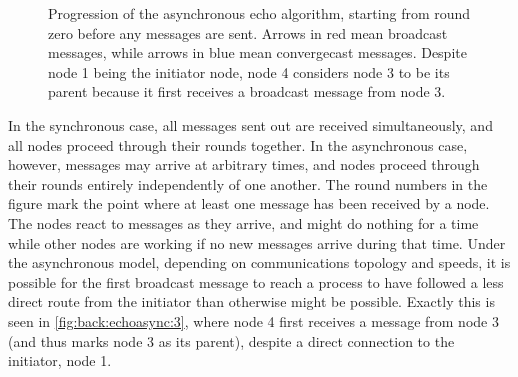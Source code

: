 \begin{figure}[htbp]
    \caption[Progression of the asynchronous \textsf{echo} algorithm]{Progression of the asynchronous \textsf{echo} algorithm, starting from round zero before any messages are sent.  Arrows in red mean broadcast messages, while arrows in blue mean convergecast messages.  Despite node 1 being the initiator node, node 4 considers node 3 to be its parent because it first receives a broadcast message from node 3.}
    \label{fig:back:echoasync}
\end{figure}

In the synchronous case, all messages sent out are received simultaneously, and all nodes proceed through their rounds together.  In the asynchronous case, however, messages may arrive at arbitrary times, and nodes proceed through their rounds entirely independently of one another.  The round numbers in the figure mark the point where at least one message has been received by a node.  The nodes react to messages as they arrive, and might do nothing for a time while other nodes are working if no new messages arrive during that time.  Under the asynchronous model, depending on communications topology and speeds, it is possible for the first broadcast message to reach a process to have followed a less direct route from the initiator than otherwise might be possible.  Exactly this is seen in \cref{fig:back:echoasync:3}, where node 4 first receives a message from node 3 (and thus marks node 3 as its parent), despite a direct connection to the initiator, node 1.